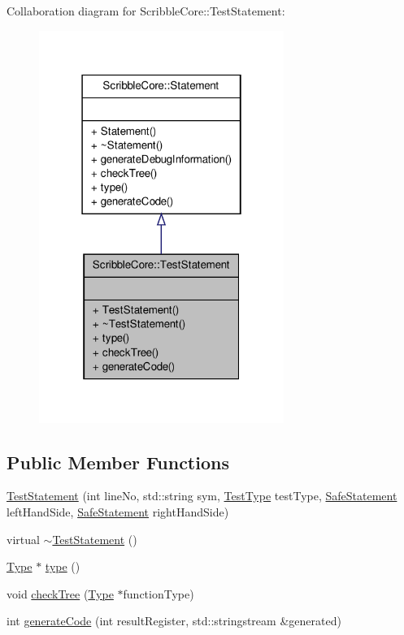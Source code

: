 Collaboration diagram for Scribble\-Core\-:\-:Test\-Statement\-:
\nopagebreak
\begin{figure}[H]
\begin{center}
\leavevmode
\includegraphics[width=226pt]{class_scribble_core_1_1_test_statement__coll__graph}
\end{center}
\end{figure}
\subsection*{Public Member Functions}
\begin{DoxyCompactItemize}
\item 
\hyperlink{class_scribble_core_1_1_test_statement_a60fca3989943a31b91ca2d1b6d8aede7}{Test\-Statement} (int line\-No, std\-::string sym, \hyperlink{namespace_scribble_core_acda463325956ca73becab2f94f6c9c5c}{Test\-Type} test\-Type, \hyperlink{namespace_scribble_core_a2ad5bf236bc9164cb56f564685f15a11}{Safe\-Statement} left\-Hand\-Side, \hyperlink{namespace_scribble_core_a2ad5bf236bc9164cb56f564685f15a11}{Safe\-Statement} right\-Hand\-Side)
\item 
virtual \hyperlink{class_scribble_core_1_1_test_statement_a93f3bf33b2be195449d3cc1cdeb8d374}{$\sim$\-Test\-Statement} ()
\item 
\hyperlink{class_scribble_core_1_1_type}{Type} $\ast$ \hyperlink{class_scribble_core_1_1_test_statement_a4460d4d4d0167f81dabdcc29aa75271d}{type} ()
\item 
void \hyperlink{class_scribble_core_1_1_test_statement_a26bad2e7c3f0ac61349e7c634a50ed62}{check\-Tree} (\hyperlink{class_scribble_core_1_1_type}{Type} $\ast$function\-Type)
\item 
int \hyperlink{class_scribble_core_1_1_test_statement_ab66075eb5fceaa849ba4bd5a7b059180}{generate\-Code} (int result\-Register, std\-::stringstream \&generated)
\end{DoxyCompactItemize}


